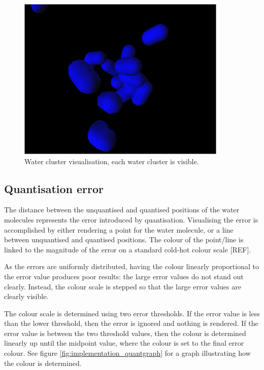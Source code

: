 \begin{figure}[h!]
  \begin{center}
    \includegraphics[width=100mm]{watercluster}
  \end{center}
  \caption{Water cluster visualisation, each water cluster is visible.}
  \label{fig:implementation_watercluster}
\end{figure}


\subsection{Quantisation error}
\label{sub:implementation_quantisation}

The distance between the unquantised and quantised positions of the water
molecules represents the error introduced by quantisation. Visualising the error is
accomplished by either rendering a point for the water molecule, or a line
between unquantised and quantised positions. The colour of the point/line is
linked to the magnitude of the error on a standard cold-hot colour scale [REF].

As the errors are uniformly distributed, having the colour linearly
proportional to the error value produces poor results: the large error values
do not stand out clearly. Instead, the colour scale is stepped so that the
large error values are clearly visible.

The colour scale is determined using two error thresholds. If the error value
is less than the lower threshold, then the error is ignored and nothing is
rendered. If the error value is between the two threshold values, then the
colour is determined linearly up until the midpoint value, where the colour is
set to the final error colour. See figure \ref{fig:implementation_quantgraph}
for a graph illustrating how the colour is determined.

